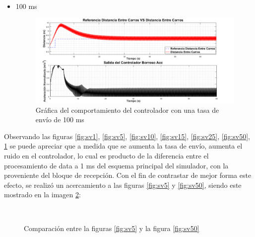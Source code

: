\begin{itemize}
\item 100 ms
\begin{figure}[H]
	\centering
		\includegraphics[scale=0.49]{Imagenes/100cv}
		\caption{Gráfica del comportamiento del controlador con una tasa de envío de 100 ms}
		\label{fig:sv100}
\end{figure}	  	  
\end{itemize}

\par Observando las figuras \ref{fig:sv1}, \ref{fig:sv5}, \ref{fig:sv10}, \ref{fig:sv15}, \ref{fig:sv25}, \ref{fig:sv50}, \ref{fig:sv100} se puede apreciar que a medida que se aumenta la tasa de envío, aumenta el ruido en el controlador, lo cual es producto de la diferencia entre el procesamiento de data a 1 ms del esquema principal del simulador, con la proveniente del bloque de recepción. Con el fin de contrastar de  mejor forma este efecto, se realizó un acercamiento a las figuras \ref{fig:sv5} y \ref{fig:sv50}, siendo este mostrado en la imagen \ref{fig:comp}:   

\begin{figure}[H]
 \centering
  \\
 \caption{Comparación entre la figuras \ref{fig:sv5} y la figura \ref{fig:sv50}}
 \label{fig:comp}
\end{figure}

